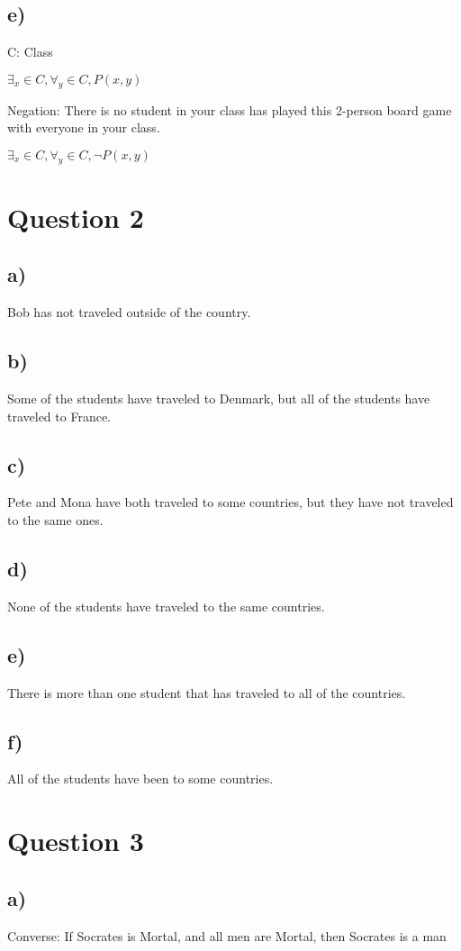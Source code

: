 \documentclass[11pt, oneside]{article}   	%
\begin{document}
\subsection{e)}
C: Class

$\exists_x \in C, \forall_y \in C, P(x, y)$

Negation:  There is no student in your class has played this 2-person board game with everyone in your class. 

$\exists_x \in C, \forall_y \in C, \neg P(x, y)$

\section{Question 2}
\subsection{a)}
Bob has not traveled outside of the country.
\subsection{b)}
Some of the students have traveled to Denmark, but all of the students have traveled to France.
\subsection{c)}
Pete and Mona have both traveled to some countries, but they have not traveled to the same ones. 
\subsection{d)} %
None of the students have traveled to the same countries. 
\subsection{e)}
There is more than one student that has traveled to all of the countries.
\subsection{f)}
All of the students have been to some countries. 
\section{Question 3}
\subsection{a)}
Converse: If Socrates is Mortal, and all men are Mortal, then Socrates is a man
	
\end{document}
